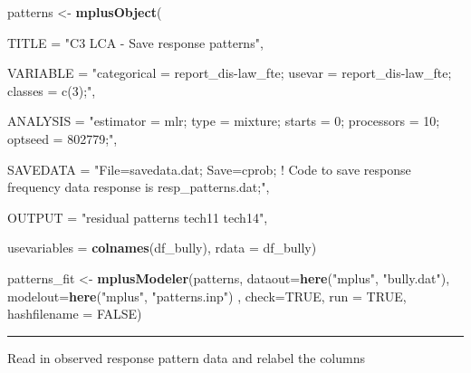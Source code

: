 \documentclass[
]{book}
\newenvironment{Shaded}{\begin{snugshade}}{\end{snugshade}}
\newcommand{\AttributeTok}[1]{\textcolor[rgb]{0.13,0.29,0.53}{#1}}
\newcommand{\ConstantTok}[1]{\textcolor[rgb]{0.56,0.35,0.01}{#1}}
\newcommand{\FunctionTok}[1]{\textcolor[rgb]{0.13,0.29,0.53}{\textbf{#1}}}
\newcommand{\NormalTok}[1]{#1}
\newcommand{\OtherTok}[1]{\textcolor[rgb]{0.56,0.35,0.01}{#1}}
\newcommand{\StringTok}[1]{\textcolor[rgb]{0.31,0.60,0.02}{#1}}
\begin{document}
\begin{Shaded}
\begin{Highlighting}[]

\NormalTok{patterns  }\OtherTok{\textless{}{-}} \FunctionTok{mplusObject}\NormalTok{(}
  
  \AttributeTok{TITLE =} \StringTok{"C3 LCA {-} Save response patterns"}\NormalTok{, }
  
  \AttributeTok{VARIABLE =} 
  \StringTok{"categorical = report\_dis{-}law\_fte; }
\StringTok{   usevar =  report\_dis{-}law\_fte;}
\StringTok{   classes = c(3);"}\NormalTok{,}
  
  \AttributeTok{ANALYSIS =} 
   \StringTok{"estimator = mlr; }
\StringTok{    type = mixture;}
\StringTok{    starts = 0;}
\StringTok{    processors = 10;}
\StringTok{    optseed = 802779;"}\NormalTok{,}
  
  \AttributeTok{SAVEDATA =} 
   \StringTok{"File=savedata.dat;}
\StringTok{    Save=cprob;}
\StringTok{    }
\StringTok{    ! Code to save response frequency data }
\StringTok{    }
\StringTok{    response is resp\_patterns.dat;"}\NormalTok{,}
  
  \AttributeTok{OUTPUT =} \StringTok{"residual patterns tech11 tech14"}\NormalTok{,}
  
  \AttributeTok{usevariables =} \FunctionTok{colnames}\NormalTok{(df\_bully),}
  \AttributeTok{rdata =}\NormalTok{ df\_bully)}

\NormalTok{patterns\_fit }\OtherTok{\textless{}{-}} \FunctionTok{mplusModeler}\NormalTok{(patterns,}
                \AttributeTok{dataout=}\FunctionTok{here}\NormalTok{(}\StringTok{"mplus"}\NormalTok{, }\StringTok{"bully.dat"}\NormalTok{),}
                \AttributeTok{modelout=}\FunctionTok{here}\NormalTok{(}\StringTok{"mplus"}\NormalTok{, }\StringTok{"patterns.inp"}\NormalTok{) ,}
                \AttributeTok{check=}\ConstantTok{TRUE}\NormalTok{, }\AttributeTok{run =} \ConstantTok{TRUE}\NormalTok{, }\AttributeTok{hashfilename =} \ConstantTok{FALSE}\NormalTok{)}
\end{Highlighting}
\end{Shaded}

\begin{center}\rule{0.5\linewidth}{0.5pt}\end{center}

Read in observed response pattern data and relabel the columns
\end{document}
